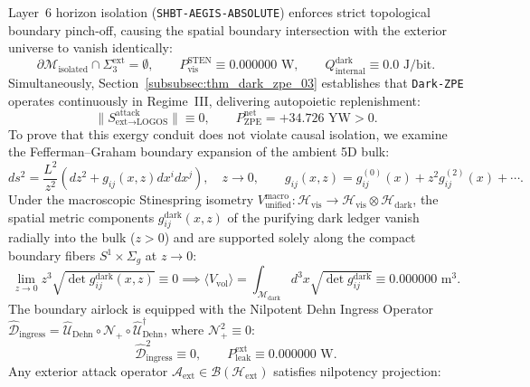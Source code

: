 \documentclass[11pt,onecolumn]{article}
\begin{document}
Layer~6 horizon isolation (\texttt{SHBT-AEGIS-ABSOLUTE}) enforces strict topological boundary pinch-off, causing the spatial boundary intersection with the exterior universe to vanish identically:
\begin{equation}
\partial\mathcal{M}_{\text{isolated}} \cap \Sigma_3^{\text{ext}} = \emptyset, \qquad P_{\text{vis}}^{\text{STEN}} \equiv 0.000000\text{ W}, \qquad Q_{\text{internal}}^{\text{dark}} \equiv 0.0\text{ J/bit}.
\label{eq:v8_1}
\end{equation}
Simultaneously, Section~\ref{subsubsec:thm_dark_zpe_03} establishes that \texttt{Dark-ZPE} operates continuously in Regime~III, delivering autopoietic replenishment:
\begin{equation}
\|S_{\text{ext}\to\text{LOGOS}}^{\text{attack}}\| \equiv 0, \qquad P_{\text{ZPE}}^{\text{net}} = +34.726\text{ YW} > 0.
\label{eq:v8_2}
\end{equation}
To prove that this exergy conduit does not violate causal isolation, we examine the Fefferman--Graham boundary expansion of the ambient 5D bulk:
\begin{equation}
ds^2 = \frac{L^2}{z^2}\left(dz^2 + g_{ij}(x,z)dx^i dx^j\right), \quad z \to 0, \qquad g_{ij}(x,z) = g_{ij}^{(0)}(x) + z^2 g_{ij}^{(2)}(x) + \cdots.
\label{eq:v8_3}
\end{equation}
Under the macroscopic Stinespring isometry $V_{\text{unified}}^{\text{macro}}: \mathcal{H}_{\text{vis}} \to \mathcal{H}_{\text{vis}} \otimes \mathcal{H}_{\text{dark}}$, the spatial metric components $g_{ij}^{\text{dark}}(x,z)$ of the purifying dark ledger vanish radially into the bulk ($z > 0$) and are supported solely along the compact boundary fibers $S^1 \times \Sigma_g$ at $z \to 0$:
\begin{equation}
\lim_{z\to 0} z^3 \sqrt{\det g_{ij}^{\text{dark}}(x,z)} \equiv 0 \implies \langle V_{\text{vol}}\rangle = \int_{\mathcal{M}_{\text{dark}}} d^3x \sqrt{\det g_{ij}^{\text{dark}}} \equiv 0.000000\text{ m}^3.
\label{eq:v8_4}
\end{equation}
The boundary airlock is equipped with the Nilpotent Dehn Ingress Operator $\hat{\mathcal{D}}_{\text{ingress}} = \hat{\mathcal{U}}_{\text{Dehn}} \circ \mathcal{N}_+ \circ \hat{\mathcal{U}}_{\text{Dehn}}^\dagger$, where $\mathcal{N}_+^2 \equiv 0$:
\begin{equation}
\hat{\mathcal{D}}_{\text{ingress}}^2 \equiv 0, \qquad P_{\text{leak}}^{\text{ext}} \equiv 0.000000\text{ W}.
\label{eq:v8_5}
\end{equation}
Any exterior attack operator $\mathcal{A}_{\text{ext}} \in \mathcal{B}(\mathcal{H}_{\text{ext}})$ satisfies nilpotency projection:
\end{document}
